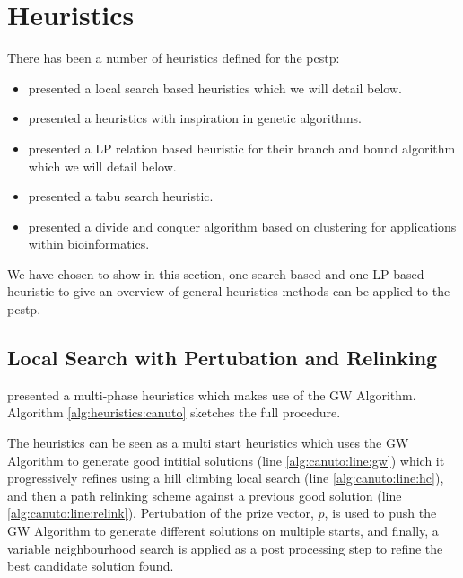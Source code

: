 \section{Heuristics}\label{sec:solving:heuristics}
There has been a number of heuristics defined for the \gls{pcstp}:

\begin{itemize}
\item \citet{canuto2001local} presented a local search based heuristics which we
   will detail below.
 \item \citet{Ljubic:2004:memetic} presented a heuristics with inspiration in genetic
   algorithms.
 \item \citet{ljubic2005solving} presented a LP relation based heuristic for their branch
   and bound algorithm which we will detail below.
\item \citet{fu2014knowledge} presented a tabu search heuristic.
 \item \citet{akhmedov2016divide} presented a divide and conquer algorithm based on clustering
    for applications within bioinformatics.
\end{itemize}
We have chosen to show in this section, one search based and one LP based heuristic to give
an overview of general heuristics methods can be applied to the \gls{pcstp}.
\subsection{Local Search with Pertubation and Relinking}\label{sec:canuto-search}

\citet{canuto2001local} presented a multi-phase heuristics which makes use of the GW Algorithm.
 Algorithm \ref{alg:heuristics:canuto} sketches the full procedure. 

 The heuristics can be seen as a multi start heuristics which uses the GW Algorithm
 to generate good intitial
 solutions (line \ref{alg:canuto:line:gw})
 which it progressively refines using a hill climbing local search
 (line \ref{alg:canuto:line:hc}),
 and then a path relinking scheme against a previous good solution
 (line \ref{alg:canuto:line:relink}).
 Pertubation of the prize vector, $p$, is used to push the GW Algorithm to generate
 different solutions on multiple starts, and finally, a
 variable neighbourhood search is applied as a
 post processing step to refine the best candidate solution found.

